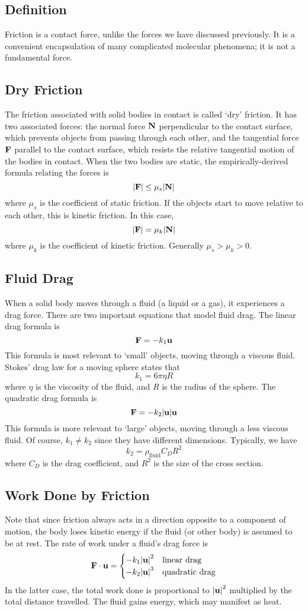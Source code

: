 \subsection{Definition}
Friction is a contact force, unlike the forces we have discussed previously.
It is a convenient encapsulation of many complicated molecular phenomena; it is not a fundamental force.

\subsection{Dry Friction}
The friction associated with solid bodies in contact is called `dry' friction.
It has two associated forces: the normal force \(\vb N\) perpendicular to the contact surface, which prevents objects from passing through each other, and the tangential force \(\vb F\) parallel to the contact surface, which resists the relative tangential motion of the bodies in contact.
When the two bodies are static, the empirically-derived formula relating the forces is
\[
	\abs{\vb F} \leq \mu_s \abs{\vb N}
\]
where \(\mu_s\) is the coefficient of static friction.
If the objects start to move relative to each other, this is kinetic friction.
In this case,
\[
	\abs{\vb F} = \mu_k \abs{\vb N}
\]
where \(\mu_k\) is the coefficient of kinetic friction.
Generally \(\mu_s > \mu_k > 0\).

\subsection{Fluid Drag}
When a solid body moves through a fluid (a liquid or a gas), it experiences a drag force.
There are two important equations that model fluid drag.
The linear drag formula is
\[
	\vb F = -k_1 \vb u
\]
This formula is most relevant to `small' objects, moving through a viscous fluid.
Stokes' drag law for a moving sphere states that
\[
	k_1 = 6 \pi \eta R
\]
where \(\eta\) is the viscosity of the fluid, and \(R\) is the radius of the sphere.
The quadratic drag formula is
\[
	\vb F = -k_2 \abs{\vb u} \vb u
\]
This formula is more relevant to `large' objects, moving through a less viscous fluid.
Of course, \(k_1 \neq k_2\) since they have different dimensions.
Typically, we have
\[
	k_2 = \rho_{\text{fluid}} C_D R^2
\]
where \(C_D\) is the drag coefficient, and \(R^2\) is the size of the cross section.

\subsection{Work Done by Friction}
Note that since friction always acts in a direction opposite to a component of motion, the body loses kinetic energy if the fluid (or other body) is assumed to be at rest.
The rate of work under a fluid's drag force is
\[
	\vb F \cdot \vb u = \begin{cases}
		-k_1 \abs{\vb u}^2 & \text{linear drag}    \\
		-k_2 \abs{\vb u}^3 & \text{quadratic drag}
	\end{cases}
\]
In the latter case, the total work done is proportional to \(\abs{\vb u}^2\) multiplied by the total distance travelled.
The fluid gains energy, which may manifest as heat.

